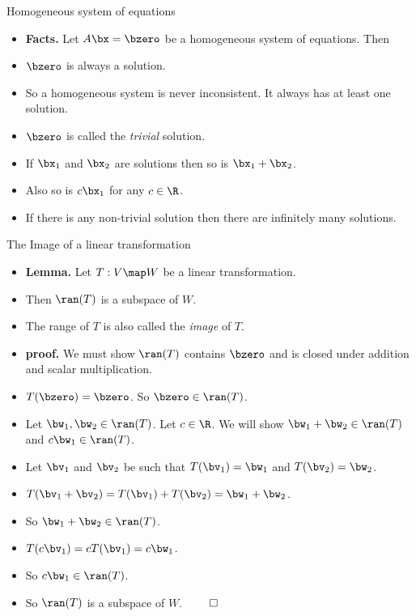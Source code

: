 \documentclass{beamer}
\begin{document}
\begin{frame}{Homogeneous system of equations}

\begin{itemize}
\item \textbf{Facts.} Let $A\bx=\bzero$ be a homogeneous system of equations. Then
\item $\bzero$ is always a solution.
\item So a homogeneous system is never inconsistent. It always has at least one solution.
\item $\bzero$ is called the \emph{trivial} solution.
\item If $\bx_1$ and $\bx_2$ are solutions then so is $\bx_1+\bx_2$.
\item Also so is $c\bx_1$ for any $c\in\R$.
\item If there is any non-trivial solution then there are infinitely many solutions.
\end{itemize}

\end{frame}


\begin{frame}{The Image of a linear transformation}

\begin{itemize}
\item \textbf{Lemma.} Let $T:V\map W$ be a linear transformation.
\item Then $\ran(T)$ is a subspace of $W$.
\item The range of $T$ is also called the \emph{image} of $T$.
\item \textbf{proof.} We must show $\ran(T)$ contains $\bzero$ and is closed
under addition and scalar multiplication.
\item $T(\bzero) = \bzero$. So $\bzero\in\ran(T)$.
\item Let $\bw_1,\bw_2\in\ran(T)$. Let $c\in\R$. We will show $\bw_1+\bw_2\in\ran(T)$ and $c\bw_1\in\ran(T)$.
\item Let $\bv_1$ and $\bv_2$ be such that $T(\bv_1)=\bw_1$ and $T(\bv_2)=\bw_2$.
\item $T(\bv_1+\bv_2)=T(\bv_1) + T(\bv_2) = \bw_1+\bw_2$.
\item So $\bw_1+\bw_2\in\ran(T)$.
\item $T(c\bv_1)=cT(\bv_1)=c\bw_1$.
\item So $c\bw_1\in\ran(T)$.
\item So $\ran(T)$ is a subspace of $W$. $\qed$
\end{itemize}

\end{frame}
\end{document}

